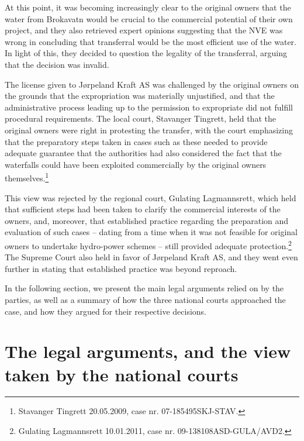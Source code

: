 At this point, it was becoming increasingly clear to the original owners that the water from Brokavatn would be crucial to the commercial potential of their own project, and they also retrieved expert opinions suggesting that the NVE was wrong in concluding that transferral would be the most efficient use of the water. In light of this, they decided to question the legality of the transferral, arguing that the decision was invalid.

The license given to Jørpeland Kraft AS was challenged by the original owners on the grounds that the expropriation was materially unjustified, and that the administrative process leading up to the permission to expropriate did not fulfill procedural requirements. The local court, Stavanger Tingrett, held that the original owners were right in protesting the transfer, with the court emphasizing that the preparatory steps taken in cases such as these needed to provide adequate guarantee that the authorities had also considered the fact that the waterfalls could have been exploited commercially by the original owners themselves.\footnote{Stavanger Tingrett 20.05.2009, case nr. 07-185495SKJ-STAV.}

This view was rejected by the regional court, Gulating Lagmannsrett, which held that sufficient steps had been taken to clarify the commercial interests of the owners, and, moreover, that established practice regarding the preparation and evaluation of such cases -- dating from a time when it was not feasible for original owners to undertake hydro-power schemes -- still provided adequate protection.\footnote{Gulating Lagmannsrett 10.01.2011, case nr. 09-138108ASD-GULA/AVD2.} The Supreme Court also held in favor of Jørpeland Kraft AS, and they went even further in stating that established practice was beyond reproach.

In the following section, we present the main legal arguments relied on by the parties, as well as a summary of how the three national courts approached the case, and how they argued for their respective decisions.

\section{The legal arguments, and the view taken by the national courts}\label{view}

